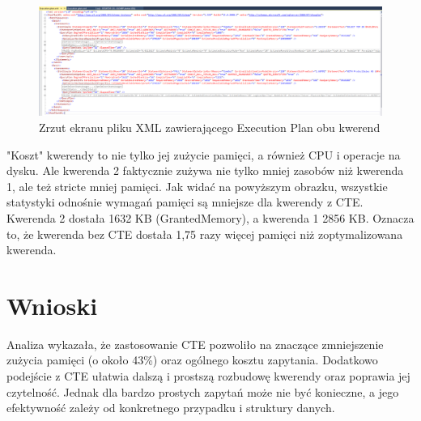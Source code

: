 \documentclass[a4paper,12pt]{article}
\begin{document}
\begin{figure}[H]
  \centering
  \includegraphics[width=1.0\textwidth]{images/memory_combined.png}
  \caption{Zrzut ekranu pliku XML zawierającego Execution Plan obu kwerend}
\end{figure}

"Koszt" kwerendy to nie tylko jej zużycie pamięci, a również CPU i operacje na dysku. Ale kwerenda 2 faktycznie zużywa nie tylko mniej zasobów niż kwerenda 1, ale też stricte mniej pamięci. Jak widać na powyższym obrazku, wszystkie statystyki odnośnie wymagań pamięci są mniejsze dla kwerendy z CTE. Kwerenda 2 dostała 1632 KB (GrantedMemory), a kwerenda 1 2856 KB. Oznacza to, że kwerenda bez CTE dostała 1,75 razy więcej pamięci niż zoptymalizowana kwerenda.


\section{Wnioski}

Analiza wykazała, że zastosowanie CTE pozwoliło na znaczące zmniejszenie zużycia pamięci (o około 43\%) oraz ogólnego kosztu zapytania. Dodatkowo podejście z CTE ułatwia dalszą i prostszą rozbudowę kwerendy oraz poprawia jej czytelność. Jednak dla bardzo prostych zapytań może nie być konieczne, a jego efektywność zależy od konkretnego przypadku i struktury danych.
\end{document}

